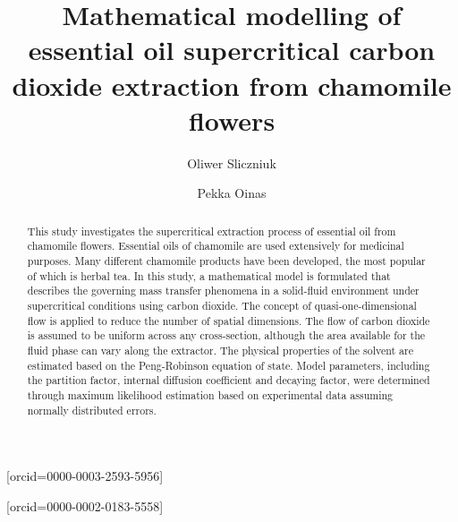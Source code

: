 \documentclass[a4paper,fleqn]{cas-dc}
\begin{document}
 

\title[mode=title]{Mathematical modelling of essential oil supercritical carbon dioxide extraction from chamomile flowers} 


\author[1]{Oliwer Sliczniuk}[orcid=0000-0003-2593-5956]
\cormark[1]

\author[1]{Pekka Oinas}[orcid=0000-0002-0183-5558]

\address[1]{Aalto University, School of Chemical Engineering, Espoo, 02150, Finland}


\begin{abstract}
This study investigates the supercritical extraction process of essential oil from chamomile flowers. Essential oils of chamomile are used extensively for medicinal purposes. Many different chamomile products have been developed, the most popular of which is herbal tea. In this study, a mathematical model is formulated that describes the governing mass transfer phenomena in a solid-fluid environment under supercritical conditions using carbon dioxide. The concept of quasi-one-dimensional flow is applied to reduce the number of spatial dimensions. The flow of carbon dioxide is assumed to be uniform across any cross-section, although the area available for the fluid phase can vary along the extractor. The physical properties of the solvent are estimated based on the Peng-Robinson equation of state. Model parameters, including the partition factor, internal diffusion coefficient and decaying factor, were determined through maximum likelihood estimation based on experimental data assuming normally distributed errors. %


\end{abstract}
\end{document}
